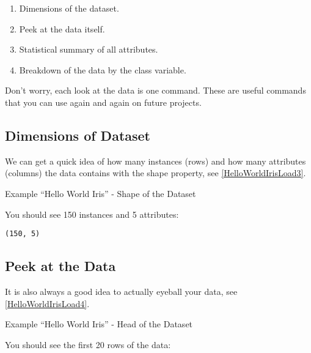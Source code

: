 \begin{enumerate}
  \item Dimensions of the dataset.
  \item Peek at the data itself.
  \item Statistical summary of all attributes.
  \item Breakdown of the data by the class variable.
\end{enumerate}    

Don't worry, each look at the data is one command. These are useful commands that you can use again and again on future projects.
    
\subsection{Dimensions of Dataset}

We can get a quick idea of how many instances (rows) and how many attributes (columns) the data contains with the shape property, see \ref{HelloWorldIrisLoad3}.
    
 
\begin{code}
        
    
    \caption{Example ``Hello World Iris'' - Shape of the Dataset} \label{HelloWorldIrisLoad3}
\end{code}      
 
You should see 150 instances and 5 attributes:

\begin{lstlisting}
(150, 5)
\end{lstlisting}
    
\subsection{Peek at the Data}

It is also always a good idea to actually eyeball your data, see \ref{HelloWorldIrisLoad4}.


\begin{code}
        
    
    \caption{Example ``Hello World Iris'' - Head of the Dataset} \label{HelloWorldIrisLoad4}
\end{code}      
 


You should see the first 20 rows of the data:

